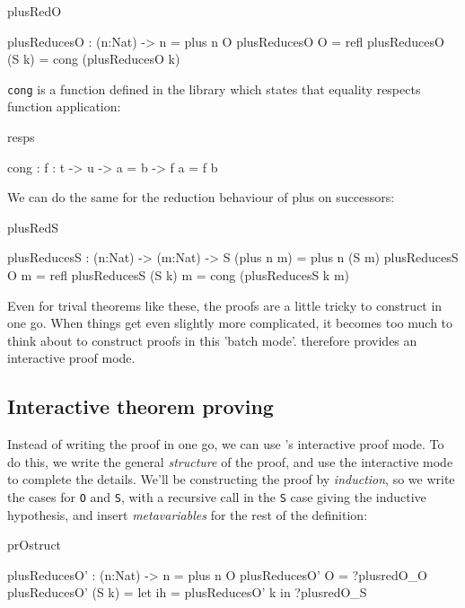 \begin{SaveVerbatim}{plusRedO}

plusReducesO : (n:Nat) -> n = plus n O
plusReducesO O = refl
plusReducesO (S k) = cong (plusReducesO k)

\end{SaveVerbatim}

\noindent
\texttt{cong} is a function defined in the library which states that
equality respects function application:

\begin{SaveVerbatim}{resps}

cong : {f : t -> u} -> a = b -> f a = f b

\end{SaveVerbatim}

\noindent
We can do the same for the reduction behaviour of plus on successors:

\begin{SaveVerbatim}{plusRedS}

plusReducesS : (n:Nat) -> (m:Nat) -> S (plus n m) = plus n (S m)
plusReducesS O m = refl
plusReducesS (S k) m = cong (plusReducesS k m)

\end{SaveVerbatim}

\noindent
Even for trival theorems like these, the proofs are a little tricky to
construct in one go. When things get even slightly more complicated, it becomes
too much to think about to construct proofs in this 'batch mode'. \Idris{}
therefore provides an interactive proof mode.

\subsection{Interactive theorem proving}

Instead of writing the proof in one go, we can use \Idris{}'s interactive
proof mode. To do this, we write the general \emph{structure} of the proof,
and use the interactive mode to complete the details. We'll be constructing
the proof by \emph{induction}, so we write the cases for \texttt{O} and
\texttt{S}, with a recursive call in the \texttt{S} case giving the inductive
hypothesis, and insert \emph{metavariables} for the rest of the definition:

\begin{SaveVerbatim}{prOstruct}

plusReducesO' : (n:Nat) -> n = plus n O
plusReducesO' O     = ?plusredO_O
plusReducesO' (S k) = let ih = plusReducesO' k in
                      ?plusredO_S

\end{SaveVerbatim}

